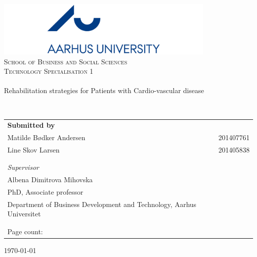 \begin{titlingpage}
\begin{center}

~ \\[2.0cm]

\includegraphics[width=0.8\textwidth]{Figure/Ase} ~\\[0.5cm]

\textsc{\LARGE School of Business and Social Sciences}\\[0.5cm]

\textsc{\Large Technology Specialisation 1} ~\\[1.0cm]


\noindent\makebox[\linewidth]{\rule{\textwidth}{0.4pt}}\\
[0.5cm]{\Huge Rehabilitation strategies for Patients with Cardio-vascular disease }
\noindent\makebox[\linewidth]{\rule{\textwidth}{0.4pt}}

\end{center}
~ \\[0.5cm]



\begin{table}[H]
\begin{tabular}{ll}
\textbf{Submitted by} & \\
Matilde Bødker Andersen  & 201407761 \\
Line Skov Larsen & 201405838 \\

\\ \\
\textit{Supervisor} & \\
Albena Dimitrova Mihovska & \\
PhD, Associate professor & \\
Department of Business Development and Technology, Aarhus Universitet & \\[1ex]
\\ \\
Page count: \pageref{LastPage} & \\
\end{tabular}
\end{table}
		

\vfill

\begin{center}
{\large \today}

\end{center}


\end{titlingpage}

\cleardoublepage